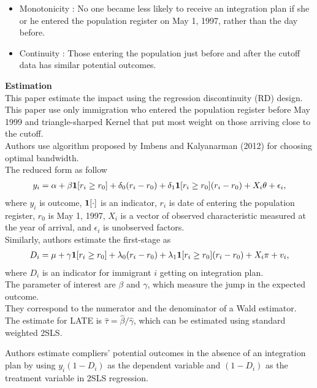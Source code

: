 \documentclass[../root]{subfiles}
\begin{document}
    \begin{itemize}
        \item Monotonicity : No one became less likely to receive an integration plan if she or he entered the population register on May 1, 1997, rather than the day before.
        \item Continuity : Those entering the population  just before and after the cutoff data has similar potential outcomes.
    \end{itemize}
    
    {\bf Estimation} \\
    This paper estimate the impact using the regression discontinuity (RD) design. \\
    This paper use only immigration who entered the population register before May 1999 and triangle-sharped Kernel that put most weight on those arriving close to the cutoff. \\
    Authors use algorithm proposed by Imbens and Kalyanarman (2012) for choosing  optimal bandwidth. \\
    
    The reduced form as follow
    \begin{align*}
        y_i = \alpha +\beta {\bf1}[r_i \geq r_0] + \delta_0(r_i- r_0) + \delta_1 {\bf1}[r_i \geq r_0] (r_i- r_0) +X_i \theta + \epsilon_i, 
    \end{align*}
    where $y_i$ is outcome, ${\bf 1}[\cdot]$ is an indicator, $r_i$ is date of entering the population register, $r_0$ is May 1, 1997, $X_i$ is a vector of observed characteristic measured at the year of arrival, and $\epsilon_i$ is unobserved factors.  \\
    
    Similarly, authors estimate the first-stage as 
    \begin{align*}
        D_i = \mu + \gamma {\bf 1}[r_i \geq r_0] + \lambda_0(r_i - r_0)  +\lambda_1 {\bf 1}[r_i \geq r_0](r_i - r_0) +X_i \pi + v_i,
    \end{align*}
    where $D_i$ is an indicator for immigrant $i$ getting on integration plan. \\
    The parameter of interest are $\beta$ and $\gamma$, which measure the jump in the expected outcome.　\\
    They correspond to the numerator and the denominator of a Wald estimator.
    The estimate for LATE is $\hat{\tau} =\hat{\beta}/\hat{\gamma} $, which can be estimated using standard weighted 2SLS.
     
     Authors estimate compliers' potential outcomes in the absence of an integration plan by using $y_i(1-D_i)$ as the dependent variable and $(1-D_i)$ as the treatment variable in 2SLS regression.
\end{document}
